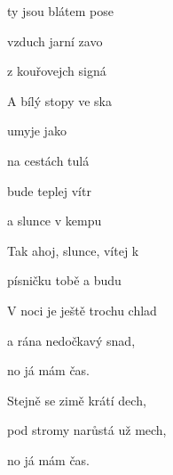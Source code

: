 
\zs
{}ty jsou blátem pose

vzduch jarní  zavo

z kouřovejch signá

A bílý stopy ve ska

umyje  jako 

na cestách tulá
\ks

\zr
{} bude teplej vítr 

a slunce  v kempu 

Tak ahoj, slunce, vítej k 

písničku  tobě  a budu 
\kr



\zs
V noci je ještě trochu chlad

a rána nedočkavý snad,

no já mám čas.

Stejně se zimě krátí dech,

pod stromy narůstá už mech,

no já mám čas.
\ks

\zr \kr
\zr \kr

\kp







